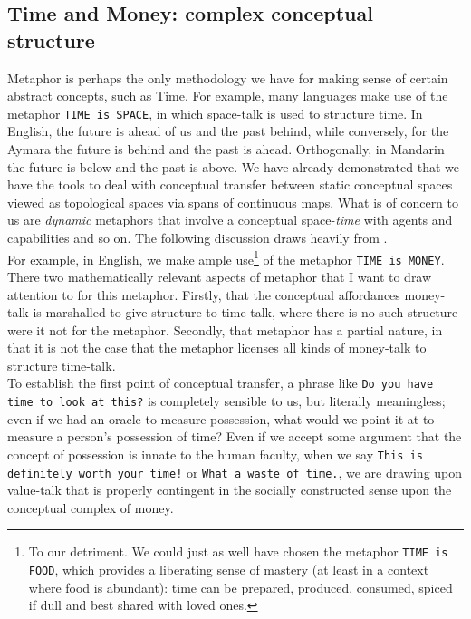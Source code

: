 \subsection{Time and Money: complex conceptual structure}

Metaphor is perhaps the only methodology we have for making sense of certain abstract concepts, such as Time. For example, many languages make use of the metaphor \texttt{TIME is SPACE}, in which space-talk is used to structure time. In English, the future is ahead of us and the past behind, while conversely, for the Aymara the future is behind and the past is ahead. Orthogonally, in Mandarin the future is below and the past is above. We have already demonstrated that we have the tools to deal with conceptual transfer between static conceptual spaces viewed as topological spaces via spans of continuous maps. What is of concern to us are \emph{dynamic} metaphors that involve a conceptual space-\emph{time} with agents and capabilities and so on. The following discussion draws heavily from \citep{lakoff_metaphors_2003}.\\

For example, in English, we make ample use\footnote{To our detriment. We could just as well have chosen the metaphor \texttt{TIME is FOOD}, which provides a liberating sense of mastery (at least in a context where food is abundant): time can be prepared, produced, consumed, spiced if dull and best shared with loved ones.} of the metaphor \texttt{TIME is MONEY}. There two mathematically relevant aspects of metaphor that I want to draw attention to for this metaphor. Firstly, that the conceptual affordances money-talk is marshalled to give structure to time-talk, where there is no such structure were it not for the metaphor. Secondly, that metaphor has a partial nature, in that it is not the case that the metaphor licenses all kinds of money-talk to structure time-talk.\\

To establish the first point of conceptual transfer, a phrase like \texttt{Do you have time to look at this?} is completely sensible to us, but literally meaningless; even if we had an oracle to measure possession, what would we point it at to measure a person's possession of time? Even if we accept some argument that the concept of possession is innate to the human faculty, when we say \texttt{This is definitely worth your time!} or \texttt{What a waste of time.}, we are drawing upon value-talk that is properly contingent in the socially constructed sense upon the conceptual complex of money.\\

